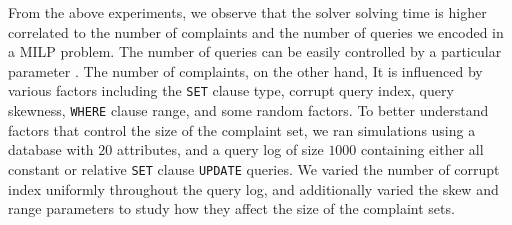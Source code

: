 From the above experiments, we observe that the solver solving time is higher  correlated to the number of complaints and the number of queries we encoded in a MILP problem. The number of queries can be easily controlled by a particular parameter . The number of complaints, on the other hand,   It is influenced by various factors including the \texttt{SET} clause type, corrupt query index, query skewness, \texttt{WHERE} clause range, and some random factors.   To better understand factors that control the size of the complaint set, we ran simulations using a database with $20$ attributes, and a query log of size $1000$ containing
either all constant or relative \texttt{SET} clause \texttt{UPDATE} queries.  
We varied the number of corrupt index uniformly throughout the query log, and additionally varied
the skew and range parameters to study how they affect the size of the complaint sets.
